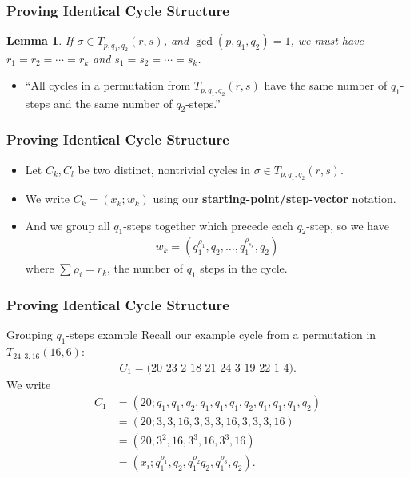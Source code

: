 \documentclass{beamer}
\theoremstyle{plain}
\newtheorem{lem}[theorem]{Lemma}
\theoremstyle{definition}
\theoremstyle{remark}
\newcommand{\bee}{\begin{equation}\begin{aligned}}
\newcommand{\eee}{\end{aligned}\end{equation}}
\renewcommand{\'}{\hspace{0.5mm}'}		%
\begin{document}

\begin{frame}
\frametitle{Proving Identical Cycle Structure}
	\begin{lem}
		If $\sigma \in T_{p,q_1,q_2}(r,s)$, 
		and 
		$\gcd(p,q_1,q_2) = 1$, we must have
		$r_1 = r_2 = \cdots = r_k$ and 
		$s_1 = s_2 = \cdots = s_k$. 
	\end{lem}
	
	\begin{itemize}
		\item ``All cycles in a permutation from 
		$T_{p,q_1,q_2}(r,s)$ have the same number of 
		$q_1$-steps and the same number of $q_2$-steps.''
	\end{itemize}

\end{frame}


\begin{frame}
\frametitle{Proving Identical Cycle Structure}
	
	\begin{itemize}
		\item Let $C_k,C_l$ be two distinct, nontrivial cycles in 
		$\sigma \in T_{p,q_1,q_2}(r,s)$. 
		\item We write $C_k = (x_k;w_k)$ using
		our \textbf{starting-point/step-vector} notation. 
		\item And we group all $q_1$-steps together which
		precede each $q_2$-step, so we have
		\bee
			w_k = (q_1^{\rho_1},q_2,\hdots, q_1^{\rho_{s_k}}, q_2)
		\eee
		where $\sum \rho_i = r_k$, the number of $q_1$ steps
		in the cycle. 
	\end{itemize}
	

\end{frame}


\begin{frame}
\frametitle{Proving Identical Cycle Structure}
	
	\begin{block}{Grouping $q_1$-steps example}
		Recall our example cycle from
		a permutation in $T_{24,3,16}(16,6)$:
		\bee
			C_1 = \text{(20 23 2 18 21 24 3 19 22 1 4)}. 
		\eee
		We write
		\bee
			C_1 &= (20; 
			q_1,q_1,q_2,q_1,q_1,q_1,q_2,q_1,q_1,q_1,q_2)\\
			&= (20; 3,3,16,3,3,3,16,3,3,3,16) \\
			&= (20;3^2,16,3^3,16,3^3,16) \\
			&= (x_i; q_1^{\rho_1},q_2,q_1^{\rho_2}
				q_2, q_1^{\rho_3},q_2). 
		\eee
	\end{block}
	

\end{frame}
\end{document}
